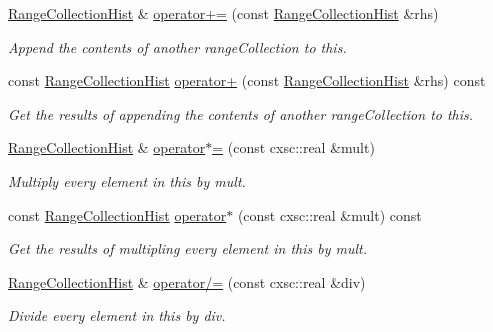 \begin{DoxyCompactItemize}
\hyperlink{classsubpavings_1_1RangeCollectionHist}{\-Range\-Collection\-Hist} \& \hyperlink{classsubpavings_1_1RangeCollectionHist_adb1fdd14f7484a22e77a7ceb65b4c8a1}{operator+=} (const \hyperlink{classsubpavings_1_1RangeCollectionHist}{\-Range\-Collection\-Hist} \&rhs)
\begin{DoxyCompactList}\small\item\em \-Append the contents of another range\-Collection to this. \end{DoxyCompactList}\item 
const \hyperlink{classsubpavings_1_1RangeCollectionHist}{\-Range\-Collection\-Hist} \hyperlink{classsubpavings_1_1RangeCollectionHist_a933eb6a39c07b990b5e734f2354e0300}{operator+} (const \hyperlink{classsubpavings_1_1RangeCollectionHist}{\-Range\-Collection\-Hist} \&rhs) const 
\begin{DoxyCompactList}\small\item\em \-Get the results of appending the contents of another range\-Collection to this. \end{DoxyCompactList}\item 
\hyperlink{classsubpavings_1_1RangeCollectionHist}{\-Range\-Collection\-Hist} \& \hyperlink{classsubpavings_1_1RangeCollectionHist_afc613e3d9ea05a796ad256b911b91145}{operator$\ast$=} (const cxsc\-::real \&mult)
\begin{DoxyCompactList}\small\item\em \-Multiply every element in this by {\itshape mult\/}. \end{DoxyCompactList}\item 
const \hyperlink{classsubpavings_1_1RangeCollectionHist}{\-Range\-Collection\-Hist} \hyperlink{classsubpavings_1_1RangeCollectionHist_ac6d582db5cdec2575db1a91c70fa7aaa}{operator$\ast$} (const cxsc\-::real \&mult) const 
\begin{DoxyCompactList}\small\item\em \-Get the results of multipling every element in this by {\itshape mult\/}. \end{DoxyCompactList}\item 
\hyperlink{classsubpavings_1_1RangeCollectionHist}{\-Range\-Collection\-Hist} \& \hyperlink{classsubpavings_1_1RangeCollectionHist_a1fef83c6e3cd8095ceaced044990612c}{operator/=} (const cxsc\-::real \&div)
\begin{DoxyCompactList}\small\item\em \-Divide every element in this by {\itshape div\/}. \end{DoxyCompactList}\item 

\end{DoxyCompactItemize}
